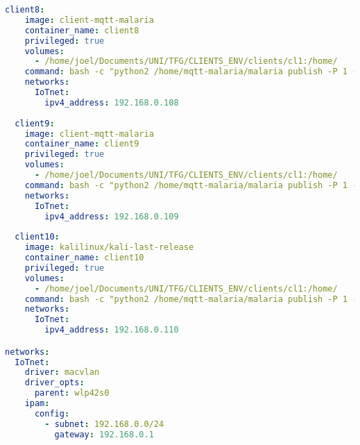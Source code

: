 \begin{lstlisting}[language=yaml, caption={Desplegament de contenidors per a l'atac Low-Rate DDoS}, label=lst:LowRateDDoS]
  client8:
    image: client-mqtt-malaria
    container_name: client8
    privileged: true
    volumes:
      - /home/joel/Documents/UNI/TFG/CLIENTS_ENV/clients/cl1:/home/
    command: bash -c "python2 /home/mqtt-malaria/malaria publish -P 1 -n 50 -H 192.168.0.15 -s 100 -q 2 -c cl8"
    networks:
      IoTnet:
        ipv4_address: 192.168.0.108
    
  client9:
    image: client-mqtt-malaria
    container_name: client9
    privileged: true
    volumes:
      - /home/joel/Documents/UNI/TFG/CLIENTS_ENV/clients/cl1:/home/
    command: bash -c "python2 /home/mqtt-malaria/malaria publish -P 1 -n 50 -t -H 192.168.0.15 -s 100 -q 2 -c cl9"
    networks:
      IoTnet:
        ipv4_address: 192.168.0.109
      
  client10:
    image: kalilinux/kali-last-release
    container_name: client10
    privileged: true
    volumes:
      - /home/joel/Documents/UNI/TFG/CLIENTS_ENV/clients/cl1:/home/
    command: bash -c "python2 /home/mqtt-malaria/malaria publish -P 1 -n 50 -t -H 192.168.0.15 -s 100 -q 2 -c cl10"
    networks:
      IoTnet:
        ipv4_address: 192.168.0.110

networks:
  IoTnet:
    driver: macvlan
    driver_opts:
      parent: wlp42s0
    ipam:
      config:
        - subnet: 192.168.0.0/24
          gateway: 192.168.0.1
\end{lstlisting}


